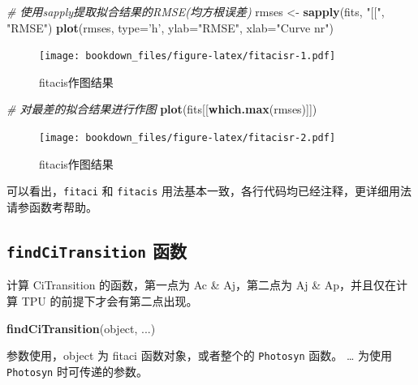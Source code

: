 \documentclass[
]{krantz}
\makeatletter
\newenvironment{Shaded}{\begin{snugshade}}{\end{snugshade}}
\newcommand{\CommentTok}[1]{\textcolor[rgb]{0.56,0.35,0.01}{\textit{#1}}}
\newcommand{\DataTypeTok}[1]{\textcolor[rgb]{0.13,0.29,0.53}{#1}}
\newcommand{\KeywordTok}[1]{\textcolor[rgb]{0.13,0.29,0.53}{\textbf{#1}}}
\newcommand{\NormalTok}[1]{#1}
\newcommand{\StringTok}[1]{\textcolor[rgb]{0.31,0.60,0.02}{#1}}
\newenvironment{kframe}{%
\medskip{}
\setlength{\fboxsep}{.8em}
 \def\at@end@of@kframe{}%
 \ifinner\ifhmode%
  \def\at@end@of@kframe{\end{minipage}}%
  \begin{minipage}{\columnwidth}%
 \fi\fi%
 \def\FrameCommand##1{\hskip\@totalleftmargin \hskip-\fboxsep
 \colorbox{shadecolor}{##1}\hskip-\fboxsep
     \hskip-\linewidth \hskip-\@totalleftmargin \hskip\columnwidth}%
 \MakeFramed {\advance\hsize-\width
   \@totalleftmargin\z@ \linewidth\hsize
   \@setminipage}}%
 {\par\unskip\endMakeFramed%
 \at@end@of@kframe}
\renewenvironment{Shaded}{\begin{kframe}}{\end{kframe}}
\makeatother
\begin{document}
\begin{Shaded}
\begin{Highlighting}[]
\CommentTok{# 使用sapply提取拟合结果的RMSE(均方根误差)}
\NormalTok{rmses <-}\StringTok{ }\KeywordTok{sapply}\NormalTok{(fits, }\StringTok{"[["}\NormalTok{, }\StringTok{"RMSE"}\NormalTok{)}
\KeywordTok{plot}\NormalTok{(rmses, }\DataTypeTok{type=}\StringTok{'h'}\NormalTok{, }\DataTypeTok{ylab=}\StringTok{"RMSE"}\NormalTok{, }\DataTypeTok{xlab=}\StringTok{"Curve nr"}\NormalTok{)}
\end{Highlighting}
\end{Shaded}

\begin{figure}
\centering
\texttt{[image: bookdown\_files/figure-latex/fitacisr-1.pdf]}
\caption{\label{fig:fitacisr1}fitacis作图结果}
\end{figure}

\begin{Shaded}
\begin{Highlighting}[]
\CommentTok{# 对最差的拟合结果进行作图}
\KeywordTok{plot}\NormalTok{(fits[[}\KeywordTok{which.max}\NormalTok{(rmses)]])}
\end{Highlighting}
\end{Shaded}

\begin{figure}
\centering
\texttt{[image: bookdown\_files/figure-latex/fitacisr-2.pdf]}
\caption{\label{fig:fitacisr2}fitacis作图结果}
\end{figure}

可以看出，\texttt{fitaci} 和 \texttt{fitacis} 用法基本一致，各行代码均已经注释，更详细用法请参函数考帮助。

\hypertarget{transition}{%
\subsection{\texorpdfstring{\texttt{findCiTransition} 函数}{findCiTransition 函数}}\label{transition}}

计算 CiTransition 的函数，第一点为 Ac \& Aj，第二点为 Aj \& Ap，并且仅在计算 TPU 的前提下才会有第二点出现。

\begin{Shaded}
\begin{Highlighting}[]
\KeywordTok{findCiTransition}\NormalTok{(object, ...)}
\end{Highlighting}
\end{Shaded}

参数使用，object 为 fitaci 函数对象，或者整个的 \texttt{Photosyn} 函数。
\ldots{} 为使用 \texttt{Photosyn} 时可传递的参数。
\end{document}

